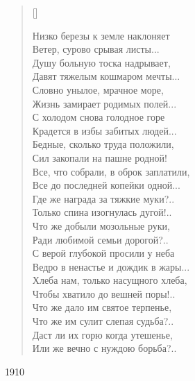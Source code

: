 \settowidth{\versewidth}{Низко березы к земле наклоняет}
\begin{verse}[\versewidth]
\begin{altverse}
Низко березы к земле наклоняет\\
Ветер, сурово срывая листы...\\
Душу больную тоска надрывает,\\
Давят тяжелым кошмаром мечты...\\
Словно унылое, мрачное море,\\
Жизнь замирает родимых полей...\\
С холодом снова голодное горе\\
Крадется в избы забитых людей...\\
Бедные, сколько труда положили,\\
Сил  закопали на пашне родной!\\
Все, что собрали, в оброк заплатили,\\
Все до последней копейки одной...\\
Где же награда за тяжкие муки?..\\
Только спина изогнулась дугой!..\\
Что же добыли мозольные руки,\\
Ради любимой семьи дорогой?..\\
С верой глубокой просили у неба\\
Ведро в ненастье и дождик в жары...\\
Хлеба нам, только насущного хлеба,\\
Чтобы хватило до вешней поры!..\\
Что же дало им святое терпенье,\\
Что же им сулит слепая судьба?..\\
Даст ли их горю когда утешенье,\\
Или же вечно с нуждою борьба?..
\end{altverse}
\end{verse}
1910



